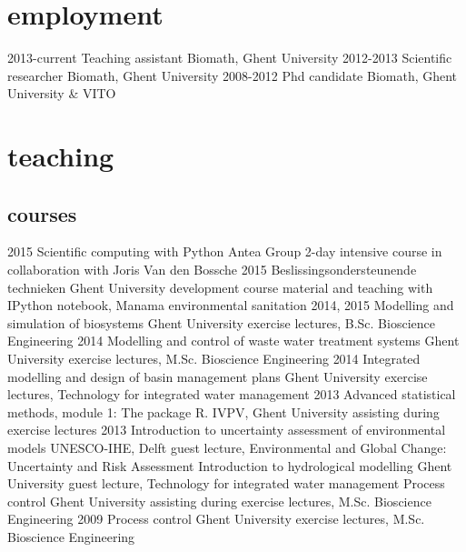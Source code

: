 \documentclass[]{friggeri-cv}  %
\begin{document}
\section{employment}

\begin{entrylist}
  \shortentry
    {2013-current}
    {Teaching assistant}
    {Biomath, Ghent University}
  \shortentry
    {2012-2013}
    {Scientific researcher}
    {Biomath, Ghent University}
  \shortentry
    {2008-2012}
    {Phd candidate}
    {Biomath, Ghent University \& VITO}
\end{entrylist}

\pagebreak

\section{teaching}
\subsection*{courses}
\begin{entrylist}
  \entry
    {2015}
    {Scientific computing with Python}
    {Antea Group}
    {2-day intensive course in collaboration with Joris Van den Bossche}
  \entry
    {2015}
    {Beslissingsondersteunende technieken}
    {Ghent University}
    {development course material and teaching with IPython notebook, Manama environmental sanitation}
  \entry
    {2014, 2015}
    {Modelling and simulation of biosystems}
    {Ghent University}
    {exercise lectures, B.Sc. Bioscience Engineering}
   \entry
    {2014} %
    {Modelling and control of waste water treatment systems}
    {Ghent University}
    {exercise lectures, M.Sc. Bioscience Engineering}
   \entry
    {2014}%
    {Integrated modelling and design of basin management plans}
    {Ghent University}
    {exercise lectures, Technology for integrated water management}
   \entry
    {2013}
    {Advanced statistical methods, module 1: The package R.}
    {IVPV, Ghent University}
    {assisting during exercise lectures}
   \entry
    {2013}
    {Introduction to uncertainty assessment of environmental models}
    {UNESCO-IHE, Delft}
    {guest lecture, Environmental and Global Change: Uncertainty and Risk Assessment}
   \entry
    {}
    {Introduction to hydrological modelling}
    {Ghent University}
    {guest lecture, Technology for integrated water management}
   \entry
	{} %
    {Process control}
    {Ghent University}
    {assisting during exercise lectures, M.Sc. Bioscience Engineering}
   \entry
    {2009}
    {Process control}
    {Ghent University}
    {exercise lectures, M.Sc. Bioscience Engineering}
\end{entrylist}
\end{document}
